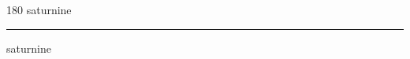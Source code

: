 
\begin{frame}
\begin{center}
\begin{turn}{180}
{\fontsize{2.5cm}{1em}\selectfont saturnine}
\end{turn}
\vspace{1em}\par  
\hrule
\vspace{1em}\par  
{\fontsize{2.5cm}{1em}\selectfont saturnine}
\end{center}
\end{frame}

